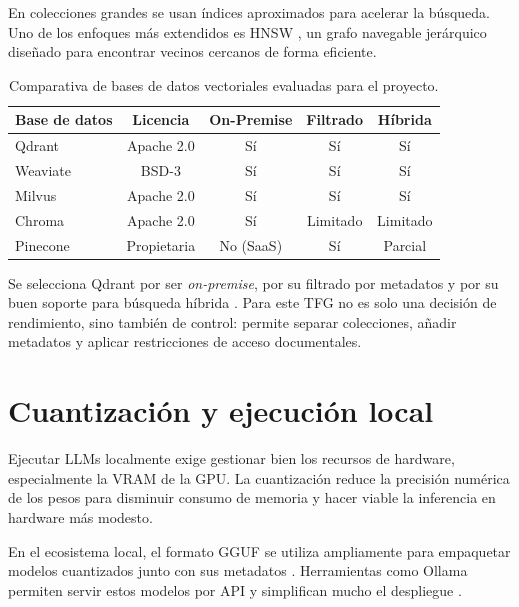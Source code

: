 En colecciones grandes se usan índices aproximados para acelerar la búsqueda. Uno de los enfoques más extendidos es HNSW \cite{malkov2016hnsw}, un grafo navegable jerárquico diseñado para encontrar vecinos cercanos de forma eficiente.

\begin{table}[H]
\centering
\caption{Comparativa de bases de datos vectoriales evaluadas para el proyecto.}
\label{tab:vectordb-comparativa}
\begin{tabular}{lcccc}
\toprule
\textbf{Base de datos} & \textbf{Licencia} & \textbf{On-Premise} & \textbf{Filtrado} & \textbf{Híbrida} \\
\midrule
Qdrant   & Apache 2.0 & Sí & Sí & Sí \\
Weaviate & BSD-3 & Sí & Sí & Sí \\
Milvus   & Apache 2.0 & Sí & Sí & Sí \\
Chroma   & Apache 2.0 & Sí & Limitado & Limitado \\
Pinecone & Propietaria & No (SaaS) & Sí & Parcial \\
\bottomrule
\end{tabular}
\end{table}

Se selecciona Qdrant por ser \textit{on-premise}, por su filtrado por metadatos y por su buen soporte para búsqueda híbrida \cite{qdrantHybridTutorial,qdrantSparseVectors}. Para este TFG no es solo una decisión de rendimiento, sino también de control: permite separar colecciones, añadir metadatos y aplicar restricciones de acceso documentales.

\section{Cuantización y ejecución local}
\label{sec:cuantizacion}

Ejecutar LLMs localmente exige gestionar bien los recursos de hardware, especialmente la VRAM de la GPU. La cuantización reduce la precisión numérica de los pesos para disminuir consumo de memoria y hacer viable la inferencia en hardware más modesto.

En el ecosistema local, el formato GGUF se utiliza ampliamente para empaquetar modelos cuantizados junto con sus metadatos \cite{ggmlGgufSpec,hfGgufDocs}. Herramientas como Ollama permiten servir estos modelos por API y simplifican mucho el despliegue \cite{ollamaImportGguf}.

